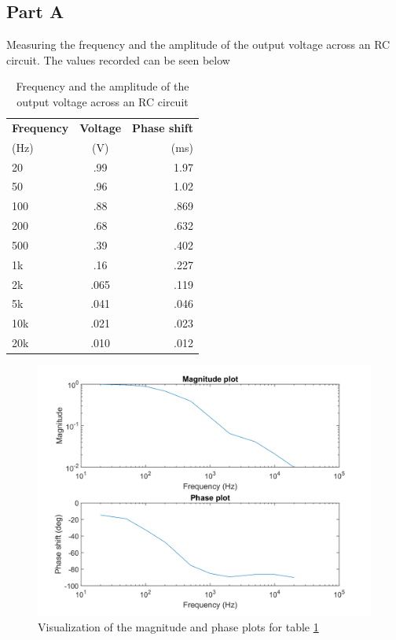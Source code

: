 \documentclass[10pt]{article}
\begin{document}
\subsection{Part A}
	Measuring the frequency and the amplitude of the output voltage across an RC circuit. The values recorded can be seen below
\begin{table}[H]
\begin{center}
	\caption{Frequency and the amplitude of the output voltage across an RC circuit}
	\label{tab: 32A}
	   \begin{tabular}{l|c|r}
		\textbf{Frequency} & \textbf{Voltage} & \textbf{Phase shift}\\
		(Hz) & (V) & (ms) \\
		\hline
		20 & .99 & 1.97\\
		50 & .96 & 1.02\\
		100 & .88 & .869\\
		200 & .68 & .632\\
		500 & .39 & .402\\
		1k & .16 & .227\\
		2k & .065 & .119\\
		5k & .041 & .046\\
		10k & .021 & .023\\
		20k & .010 & .012\\
	\end{tabular}
\end{center}
\end{table}
\begin{center}
	\begin{figure} [H]
		\centering
		\includegraphics[scale=0.4]{images/ourRC.png}
		\caption{Visualization of the magnitude and phase plots for table \ref{tab: 32A}}
		\label{fig:32A5}
	\end{figure}
\end{center}
\end{document}
